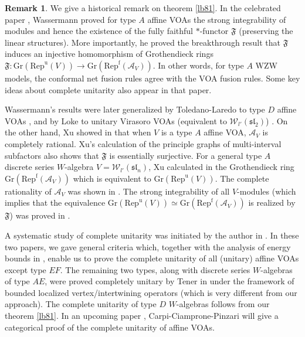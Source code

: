 \documentclass[12pt,a4paper]{article}
\theoremstyle{definition}
\newtheorem{rem}[df]{Remark}
\theoremstyle{plain}
\newcommand{\fk}{\mathfrak}
\newcommand{\mc}{\mathcal}
\newcommand{\Repu}{\mathrm{Rep}^{\mathrm u}}
\newcommand{\Repf}{\mathrm{Rep}^{\mathrm f}}
\newcommand{\RepuV}{\mathrm{Rep}^{\mathrm u}(V)}
\newcommand{\Gr}{\mathrm{Gr}}
\numberwithin{equation}{subsection}
\begin{document}
\begin{rem}
We give a historical remark on theorem \ref{lb81}. In the celebrated paper  \cite{Was98}, Wassermann proved for type $A$ affine VOAs the strong integrability of modules and hence the existence of the fully faithful $*$-functor $\fk F$ (preserving the linear structures). More importantly, he proved the breakthrough result that $\fk F$ induces an injective homomorphism of Grothendieck rings $\fk F:\Gr(\Repu(V))\rightarrow\Gr(\Repf(\mc A_V))$. In other words, for type $A$ WZW models, the conformal net fusion rules  agree with the VOA fusion rules.  Some key ideas about complete unitarity also appear in that paper. 

Wassermann's results were later generalized by Toledano-Laredo to type $D$ affine VOAs \cite{TL04}, and by Loke to unitary Virasoro VOAs (equivalent to $\mc W_{l'}(\fk{sl}_2)$) \cite{Loke94}. On the other hand, Xu showed in \cite{Xu00a} that when $V$ is a type $A$ affine VOA, $\mc A_V$ is completely rational. Xu's calculation of the principle graphs of  multi-interval subfactors also shows that $\fk F$ is essentially surjective. For a general type $A$ discrete series $W$-algebra $V=\mc W_{l'}(\fk{sl}_n)$, Xu calculated in \cite{Xu00b} the Grothendieck ring $\Gr(\Repf(\mc A_V))$ which is equivalent to $\Gr(\RepuV)$. The complete rationality of $\mc A_V$ was shown in \cite{Xu01,Lon03}. The strong integrability of all $V$-modules (which implies that the equivalence $\Gr(\RepuV)\simeq\Gr(\Repf(\mc A_V))$ is realized by $\fk F$) was proved in \cite{CWX}.

A systematic study of complete unitarity was initiated by the author in \cite{Gui19a,Gui19b}. In these two papers, we gave general criteria which, together with the analysis of energy bounds in \cite{Was98,TL04,Gui19c}, enable us to prove the complete unitarity of all (unitary) affine VOAs except type $EF$. The remaining two types, along with discrete series $W$-algebras of type $AE$, were proved completely unitary by Tener in \cite{Ten19c} under the framework of bounded localized vertex/intertwining operators (which is very different from our approach). The complete unitarity of type $D$ $W$-algebras follows from our theorem \ref{lb81}. In an upcoming paper \cite{CCP}, Carpi-Ciamprone-Pinzari will give a categorical proof of the complete unitarity of affine VOAs.


\end{rem}
\end{document}
